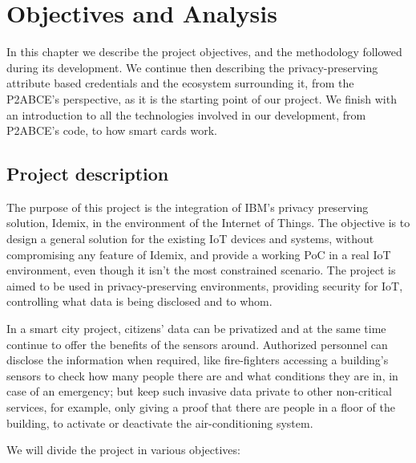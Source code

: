 \chapter{Objectives and Analysis}\label{ch:objectives}

In this chapter we describe the project objectives, and the methodology followed during its development. We continue then describing the privacy-preserving attribute based credentials and the ecosystem surrounding it, from the P2ABCE's perspective, as it is the starting point of our project. We finish with an introduction to all the technologies involved in our development, from P2ABCE's code, to how smart cards work.

\section{Project description}

The purpose of this project is the integration of IBM's privacy preserving solution, Idemix, in the environment of the Internet of Things. The objective is to design a general solution for the existing IoT devices and systems, without compromising any feature of Idemix, and provide a working PoC in a real IoT environment, even though it isn't the most constrained scenario. The project is aimed to be used in privacy-preserving environments, providing security for IoT, controlling what data is being disclosed and to whom.

In a smart city project, citizens' data can be privatized and at the same time continue to offer the benefits of the sensors around. Authorized personnel can disclose the information when required, like fire-fighters accessing a building's sensors to check how many people there are and what conditions they are in, in case of an emergency; but keep such invasive data private to other non-critical services, for example, only giving a proof that there are people in a floor of the building, to activate or deactivate the air-conditioning system.

\hfil


We will divide the project in various objectives:


